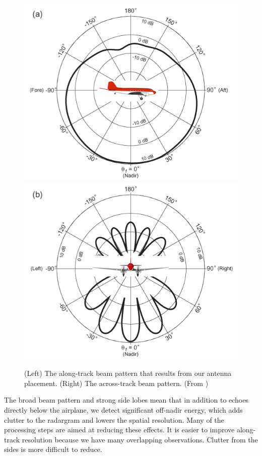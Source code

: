 \documentclass[11pt]{article}
\begin{document}
\begin{figure}[ht!]
\centering
\includegraphics[width=0.48\columnwidth]{figures/beam_pattern_along_track.png}
\includegraphics[width=0.48\columnwidth]{figures/beam_pattern_cross_track.png}
\caption[]{(Left) The along-track beam pattern that results from our antenna placement. (Right) The across-track beam pattern. (From \cite{Peters2007})}
\label{fig:beam_pattern}
\end{figure}

The broad beam pattern and strong side lobes mean that in addition to echoes directly below the airplane, we detect significant off-nadir energy, which adds clutter to the radargram and lowers the spatial resolution. Many of the processing steps are aimed at reducing these effects. It is easier to improve along-track resolution because we have many overlapping observations. Clutter from the sides is more difficult to reduce. 
\end{document}
